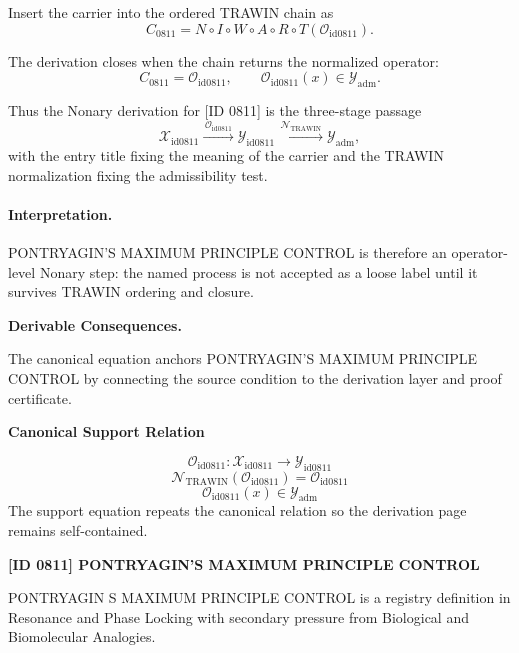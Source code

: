 Insert the carrier into the ordered TRAWIN chain as\[
C_{0811}=N\circ I\circ W\circ A\circ R\circ T(\mathcal{O}_{\mathrm{id0811}}).
\]

The derivation closes when the chain returns the normalized operator:\[
C_{0811}=\mathcal{O}_{\mathrm{id0811}},\qquad \mathcal{O}_{\mathrm{id0811}}(x)\in\mathcal{Y}_{\mathrm{adm}}.
\]

Thus the Nonary derivation for [ID 0811] is the three-stage passage
\[
\mathcal{X}_{\mathrm{id0811}}\xrightarrow{\,\mathcal{O}_{\mathrm{id0811}}\,} \mathcal{Y}_{\mathrm{id0811}}\xrightarrow{\,\mathcal{N}_{\mathrm{TRAWIN}}\,} \mathcal{Y}_{\mathrm{adm}},
\]
with the entry title fixing the meaning of the carrier and the TRAWIN normalization fixing the admissibility test.

\paragraph{Interpretation.} PONTRYAGIN’S MAXIMUM PRINCIPLE CONTROL is therefore an operator-level Nonary step: the named process is not accepted as a loose label until it survives TRAWIN ordering and closure.

\par\vspace{0.35em}
\noindent\textbf{Derivable Consequences.}\quad
\begingroup
\footnotesize
\raggedright
The canonical equation anchors PONTRYAGIN'S MAXIMUM PRINCIPLE CONTROL by connecting the source condition to the derivation layer and proof certificate.
\par\endgroup

\noindent\textbf{Canonical Support Relation}\par
\[
\mathcal{O}_{\mathrm{id0811}}:\mathcal{X}_{\mathrm{id0811}}\longrightarrow\mathcal{Y}_{\mathrm{id0811}}
\]
\[
\mathcal{N}_{\mathrm{TRAWIN}}(\mathcal{O}_{\mathrm{id0811}})=\mathcal{O}_{\mathrm{id0811}}
\]
\[
\mathcal{O}_{\mathrm{id0811}}(x)\in\mathcal{Y}_{\mathrm{adm}}
\]
\noindent The support equation repeats the canonical relation so the derivation page remains self-contained.\par

\clearpage
\noindent\textbf{[ID 0811] PONTRYAGIN'S MAXIMUM PRINCIPLE CONTROL}\par
\vspace{0.35em}
\begingroup\small
{}
PONTRYAGIN S MAXIMUM PRINCIPLE CONTROL is a registry definition in Resonance and Phase Locking with secondary pressure from Biological and Biomolecular Analogies.

